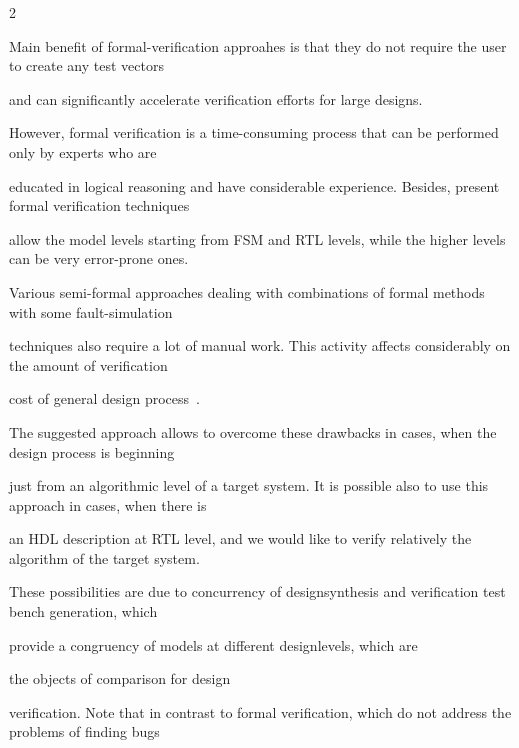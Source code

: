\begin{multicols}{2}
   \noindent


Main benefit of formal-verification approahes  is that  they do not require the user to create any test vectors


and can significantly accelerate verification efforts for large designs.





   However, formal verification is a time-consuming process that can be performed only by experts who are


educated in logical reasoning and have considerable experience. Besides, present formal verification techniques


allow the model levels starting from FSM and RTL levels, while the higher levels can be very error-prone ones.





   Various semi-formal approaches dealing with combinations of formal methods with some fault-simulation


techniques also require a lot of manual work. This activi\-ty affects considerably on the amount of verification


cost of general design process~\cite{3bar}.





   The suggested approach allows to overcome these drawbacks in cases, when the design process is be\-ginning


just from an algorithmic level of a target system. It is possible also to use this approach in cases, when there is


an HDL description at RTL level, and we would like to verify relatively the algorithm of the target system.





   These possibilities are due to concurrency of design\linebreak synthesis and verification test bench generation, which


provide a congruency of models at different design\linebreak levels, which are


the objects of comparison for design


veri\-fi\-cation. Note that in contrast to formal veri\-fi\-cation, which do not address the problems of finding bugs\linebreak



\end{multicols}
